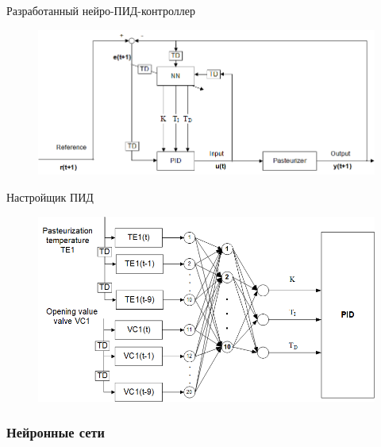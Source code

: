 \documentclass{beamer}
\begin{document}
{  \begin{frame}{Разработанный нейро-ПИД-контроллер}
    \begin{figure}
        \centering
        \includegraphics[width=\textwidth]{images/developed-NN.png}
    \end{figure}
  \end{frame}

  \begin{frame}{Настройщик ПИД}
    \begin{figure}
        \centering
        \includegraphics[width=\textwidth]{images/neuro-adjuster-PID.png}
    \end{figure}
  \end{frame}

  \begin{frame}
    \frametitle{Нейронные сети}

    \centering

\end{frame}
 }
\end{document}
